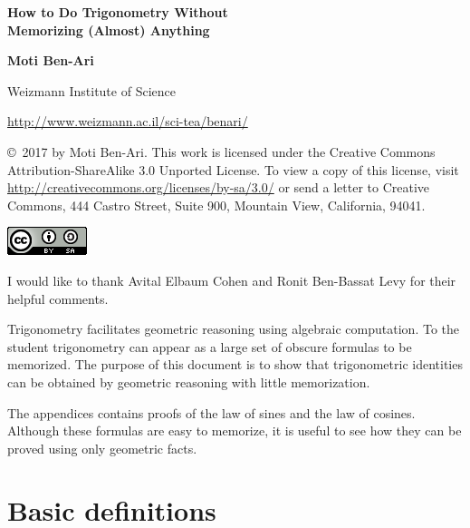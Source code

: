 \documentclass[11pt,a4paper]{article}
\begin{document}
\thispagestyle{empty}


\begin{center}
\textbf{\LARGE How to Do Trigonometry Without\\\medskip
Memorizing (Almost) Anything}

\bigskip
\bigskip

\textbf{\Large Moti Ben-Ari}

\medskip

Weizmann Institute of Science

\url{http://www.weizmann.ac.il/sci-tea/benari/}
\end{center}

{\footnotesize \copyright{}\  2017 by Moti Ben-Ari. This work is licensed under the Creative Commons Attribution-ShareAlike 3.0 Unported License. To view a copy of this license, visit \url{http://creativecommons.org/licenses/by-sa/3.0/} or send a letter to Creative Commons, 444 Castro Street, Suite 900, Mountain View, California, 94041.}

\begin{center}
\includegraphics[width=.2\textwidth]{../by-sa.png}
\end{center}


\bigskip

I would like to thank Avital Elbaum Cohen and Ronit Ben-Bassat Levy for their helpful comments.

\bigskip

Trigonometry facilitates geometric reasoning using algebraic computation. To the student trigonometry can appear as a large set of obscure formulas to be memorized. The purpose of this document is to show that trigonometric identities can be obtained by geometric reasoning with little memorization.

The appendices contains proofs of the law of sines and the law of cosines. Although these formulas are easy to memorize, it is useful to see how they can be proved using only geometric facts.


\section{Basic definitions}
\end{document}
